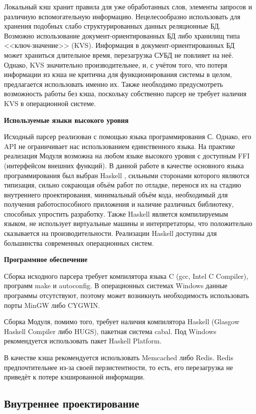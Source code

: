 Локальный кэш хранит правила для уже обработанных слов, элементы запросов и различную вспомогательную информацию. Нецелесообразно использовать для хранения подобных слабо структурированных данных реляционные БД. Возможно использование документ-ориентированных БД либо хранилищ типа <<ключ-значение>> (KVS). Информация в документ-ориентированных БД может храниться длительное время, перезагрузка СУБД не повлияет на неё. Однако, KVS значительно производительнее, и, с учётом того, что потеря информации из кэша не критична для функционирования системы в целом, предлагается использовать именно их. Также необходимо предусмотреть возможность работы без кэша, поскольку собственно парсер не требует наличия KVS в операционной системе.

\textbf{Используемые языки высокого уровня}

Исходный парсер реализован с помощью языка программирования С. Однако, его API не ограничивает нас использованием единственного языка. На практике реализация Модуля возможна на любом языке высокого уровня с доступным FFI (интерфейсом внешних функций). В данной работе в качестве основного языка программирования был выбран Haskell \cite{haskell}, сильными сторонами которого являются типизация, сильно сокрающая объём работ по отладке, перенося их на стадию внутреннего проектирования, минимальный объём кода, необходимый для получения работоспособного приложения и наличие различных библиотеку, способных упростить разработку. Также Haskell является компилируемым языком, не использует виртуальные машины и интерпретаторы, что положительно сказывается на производительности. Реализации Haskell доступны для большинства современных операционных систем.

\textbf{Программное обеспечение}

Сборка исходного парсера требует компилятора языка C (gcc, Intel C Compiler), программ make и autoconfig. В операционных системах Windows данные программы отсутствуют, поэтому может возникнуть необходимость использовать порты MinGW либо CYGWIN.

Сборка Модуля, помимо того, требует наличия компилятора Haskell (Glasgow Haskell Compiler либо HUGS), пакетная система cabal. Под Windows рекомендуется использовать пакет Haskell Platform.

В качестве кэша рекомендуется использовать Memcached либо Redis. Redis предпочтительнее из-за своей перзистентности, то есть, его перезагрузка не приведёт к потере кэшированной информации.

\subsection{Внутреннее проектирование}

